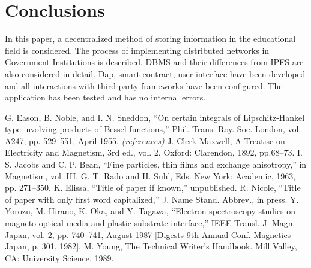 \documentclass[10pt,conference,a4paper]{IEEEtran_EDM}
\begin{document}
\section{Conclusions }
In this paper, a decentralized method of storing information in the educational field is considered. The process of implementing distributed networks in Government Institutions is described. DBMS and their differences from IPFS are also considered in detail. Dap, smart contract, user interface have been developed and all interactions with third-party frameworks have been configured. The application has been tested and has no internal errors.

\begin{thebibliography}{00}
 G. Eason, B. Noble, and I. N. Sneddon, ``On certain integrals of Lipschitz-Hankel type involving products of Bessel functions,'' Phil. Trans. Roy. Soc. London, vol. A247, pp. 529--551, April 1955. \textit{(references)}
 J. Clerk Maxwell, A Treatise on Electricity and Magnetism, 3rd ed., vol. 2. Oxford: Clarendon, 1892, pp.68--73.
 I. S. Jacobs and C. P. Bean, ``Fine particles, thin films and exchange anisotropy,'' in Magnetism, vol. III, G. T. Rado and H. Suhl, Eds. New York: Academic, 1963, pp. 271--350.
 K. Elissa, ``Title of paper if known,'' unpublished.
 R. Nicole, ``Title of paper with only first word capitalized,'' J. Name Stand. Abbrev., in press.
 Y. Yorozu, M. Hirano, K. Oka, and Y. Tagawa, ``Electron spectroscopy studies on magneto-optical media and plastic substrate interface,'' IEEE Transl. J. Magn. Japan, vol. 2, pp. 740--741, August 1987 [Digests 9th Annual Conf. Magnetics Japan, p. 301, 1982].
 M. Young, The Technical Writer's Handbook. Mill Valley, CA: University Science, 1989.
\end{thebibliography}
\vspace{12pt}
\color{red}
\end{document}
